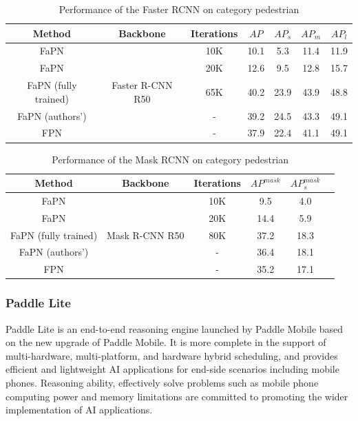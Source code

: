 \begin{table}[htb]
    \begin{center}
        \caption{Performance of the Faster RCNN on category pedestrian}\label{table1}
        \begin{tabular}{|c|c|c|c|c|c|c|} %
            \toprule
            \textbf{Method} & \textbf{Backbone}&\textbf{Iterations} & $AP$ & $AP_s$ & $AP_m$ & $AP_l$ \\
            \hline
            FaPN          & \multirow{5}{*}{Faster R-CNN R50}&10K &10.1&5.3&11.4&11.9 \\
            FaPN          &  &20K&12.6&9.5&12.8&15.7 \\
			FaPN (fully trained)         & &65K &40.2&23.9&43.9&48.8 \\
			FaPN (authors')         &  &-&39.2&24.5&43.3&49.1 \\
			FPN  & &- &37.9&22.4&41.1&49.1 \\
            \bottomrule
        \end{tabular}
    \end{center}
\end{table}

\begin{table}[htb]
		\begin{center}
			\caption{Performance of the Mask RCNN on category pedestrian}\label{table2}
			\begin{tabular}{|c|c|c|c|c|c} %
				\toprule
				\textbf{Method} & \textbf{Backbone}&\textbf{Iterations} & $AP^{mask}$ & $AP^{mask}_s$ \\
				\hline
				FaPN & \multirow{5}{*}{Mask R-CNN R50}&10K&9.5&4.0 \\
				FaPN & &20K&14.4&5.9 \\
				FaPN (fully trained) & &80K &37.2&18.3 \\
				FaPN (authors') & &- &36.4&18.1 \\
				FPN & &- &35.2&17.1 \\
				\bottomrule
			\end{tabular}
		\end{center}
	\end{table}


\subsubsection{Paddle Lite}
Paddle Lite \cite{paddlelite} is an end-to-end reasoning engine launched by Paddle Mobile based on the new upgrade of Paddle Mobile. It is more complete in the support of multi-hardware, multi-platform, and hardware hybrid scheduling, and provides efficient and lightweight AI applications for end-side scenarios including mobile phones. Reasoning ability, effectively solve problems such as mobile phone computing power and memory limitations are committed to promoting the wider implementation of AI applications.

